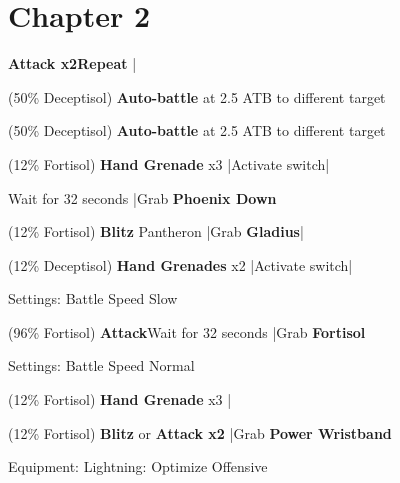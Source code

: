 \section{Chapter 2}

\begin{mainlist}
	\item {}
	\item {} \textbf{Attack x2}\to \textbf{Repeat} |\skip
	\item {} (50\% Deceptisol) \textbf{Auto-battle} at 2.5 ATB to different target
	\item {} (50\% Deceptisol) \textbf{Auto-battle} at 2.5 ATB to different target
	\item {}
	\item {} (12\% Fortisol) \textbf{Hand Grenade} x3 |Activate switch|
	\item {} Wait for 32 seconds |Grab \textbf{Phoenix Down}
	\item {} (12\% Fortisol) \textbf{Blitz} Pantheron |Grab \textbf{Gladius}|
	\item {} (12\% Deceptisol) \textbf{Hand Grenades} x2 |Activate switch|\skip
\end{mainlist}
\begin{menu}
	\item Settings: Battle Speed Slow
\end{menu}
\begin{mainlist}
	\item {}
	\item {} (96\% Fortisol) \textbf{Attack}\to Wait for 32 seconds |Grab \textbf{Fortisol}
\end{mainlist}
\begin{menu}
	\item Settings: Battle Speed Normal
\end{menu}
\begin{mainlist}
	\item \skip
	\item {} (12\% Fortisol) \textbf{Hand Grenade} x3 |
	\item {} (12\% Fortisol) \textbf{Blitz} or \textbf{Attack x2} |Grab \textbf{Power Wristband}
\end{mainlist}
\begin{menu}
	\item Equipment: Lightning: Optimize Offensive
\end{menu}
